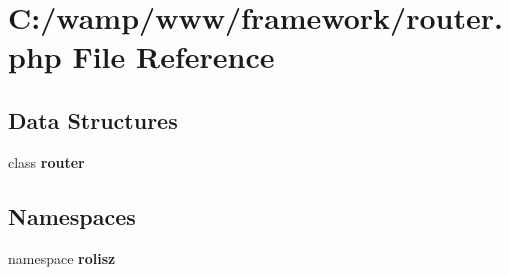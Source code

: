 \section{C:/wamp/www/framework/router.php File Reference}
\label{router_8php}
\subsection*{Data Structures}
\begin{DoxyCompactItemize}
\item 
class {\bf router}
\end{DoxyCompactItemize}
\subsection*{Namespaces}
\begin{DoxyCompactItemize}
\item 
namespace {\bf rolisz}
\end{DoxyCompactItemize}
